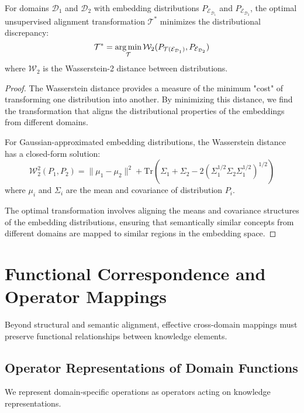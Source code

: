 \begin{theorem}
For domains $\mathcal{D}_1$ and $\mathcal{D}_2$ with embedding distributions $P_{\mathcal{E}_{\mathcal{D}_1}}$ and $P_{\mathcal{E}_{\mathcal{D}_2}}$, the optimal unsupervised alignment transformation $\mathcal{T}^*$ minimizes the distributional discrepancy:
\begin{equation}
\mathcal{T}^* = \mathop{\mathrm{arg\,min}}_{\mathcal{T}} \mathcal{W}_2(P_{\mathcal{T}(\mathcal{E}_{\mathcal{D}_1})}, P_{\mathcal{E}_{\mathcal{D}_2}})
\end{equation}
where $\mathcal{W}_2$ is the Wasserstein-2 distance between distributions.
\end{theorem}

\begin{proof}
The Wasserstein distance provides a measure of the minimum "cost" of transforming one distribution into another. By minimizing this distance, we find the transformation that aligns the distributional properties of the embeddings from different domains.

For Gaussian-approximated embedding distributions, the Wasserstein distance has a closed-form solution:
\begin{equation}
\mathcal{W}_2^2(P_1, P_2) = \|\mu_1 - \mu_2\|^2 + \text{Tr}(\Sigma_1 + \Sigma_2 - 2(\Sigma_1^{1/2}\Sigma_2\Sigma_1^{1/2})^{1/2})
\end{equation}
where $\mu_i$ and $\Sigma_i$ are the mean and covariance of distribution $P_i$.

The optimal transformation involves aligning the means and covariance structures of the embedding distributions, ensuring that semantically similar concepts from different domains are mapped to similar regions in the embedding space.
\end{proof}

\section{Functional Correspondence and Operator Mappings}

Beyond structural and semantic alignment, effective cross-domain mappings must preserve functional relationships between knowledge elements.

\subsection{Operator Representations of Domain Functions}

We represent domain-specific operations as operators acting on knowledge representations.

